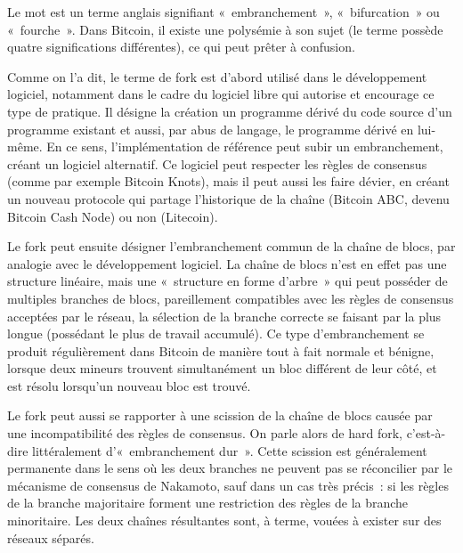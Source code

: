 Le mot  est un terme anglais signifiant «~embranchement~», «~bifurcation~» ou «~fourche~». Dans Bitcoin, il existe une polysémie à son sujet (le terme possède quatre significations différentes), ce qui peut prêter à confusion.

Comme on l'a dit, le terme de fork est d'abord utilisé dans le développement logiciel, notamment dans le cadre du logiciel libre qui autorise et encourage ce type de pratique. Il désigne la création un programme dérivé du code source d'un programme existant et aussi, par abus de langage, le programme dérivé en lui-même. En ce sens, l'implémentation de référence peut subir un embranchement, créant un logiciel alternatif. Ce logiciel peut respecter les règles de consensus (comme par exemple Bitcoin Knots), mais il peut aussi les faire dévier, en créant un nouveau protocole qui partage l'historique de la chaîne (Bitcoin ABC, devenu Bitcoin Cash Node) ou non (Litecoin).

Le fork peut ensuite désigner l'embranchement commun de la chaîne de blocs, par analogie avec le développement logiciel. La chaîne de blocs n'est en effet pas une structure linéaire, mais une «~structure en forme d'arbre~» qui peut posséder de multiples branches de blocs, pareillement compatibles avec les règles de consensus acceptées par le réseau, la sélection de la branche correcte se faisant par la plus longue (possédant le plus de travail accumulé). Ce type d'embranchement se produit régulièrement dans Bitcoin de manière tout à fait normale et bénigne, lorsque deux mineurs trouvent simultanément un bloc différent de leur côté, et est résolu lorsqu'un nouveau bloc est trouvé.

Le fork peut aussi se rapporter à une scission de la chaîne de blocs causée par une incompatibilité des règles de consensus. On parle alors de hard fork, c'est-à-dire littéralement d'«~embranchement dur~». Cette scission est généralement permanente dans le sens où les deux branches ne peuvent pas se réconcilier par le mécanisme de consensus de Nakamoto, sauf dans un cas très précis~: si les règles de la branche majoritaire forment une restriction des règles de la branche minoritaire. Les deux chaînes résultantes sont, à terme, vouées à exister sur des réseaux séparés.

